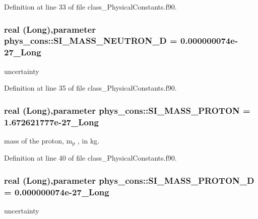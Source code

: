 Definition at line 33 of file class\_\-PhysicalConstants.f90.

\hypertarget{namespacephys__cons_af635c94d544c5bc6dcb05186a9f81d84}{
\subsubsection[{SI\_\-MASS\_\-NEUTRON\_\-D}]{\setlength{\rightskip}{0pt plus 5cm}real (Long),parameter {\bf phys\_\-cons::SI\_\-MASS\_\-NEUTRON\_\-D} = 0.000000074e-\/27\_\-Long}}
\label{namespacephys__cons_af635c94d544c5bc6dcb05186a9f81d84}


uncertainty 



Definition at line 35 of file class\_\-PhysicalConstants.f90.

\hypertarget{namespacephys__cons_a6a740864089f117512dc89ea53f3dc5f}{
\subsubsection[{SI\_\-MASS\_\-PROTON}]{\setlength{\rightskip}{0pt plus 5cm}real (Long),parameter {\bf phys\_\-cons::SI\_\-MASS\_\-PROTON} = 1.672621777e-\/27\_\-Long}}
\label{namespacephys__cons_a6a740864089f117512dc89ea53f3dc5f}


mass of the proton, m$_{\mbox{p}}$ , in kg. 



Definition at line 40 of file class\_\-PhysicalConstants.f90.

\hypertarget{namespacephys__cons_a3c37a18a918519962cfc26597082d53d}{
\subsubsection[{SI\_\-MASS\_\-PROTON\_\-D}]{\setlength{\rightskip}{0pt plus 5cm}real (Long),parameter {\bf phys\_\-cons::SI\_\-MASS\_\-PROTON\_\-D} = 0.000000074e-\/27\_\-Long}}
\label{namespacephys__cons_a3c37a18a918519962cfc26597082d53d}


uncertainty 



